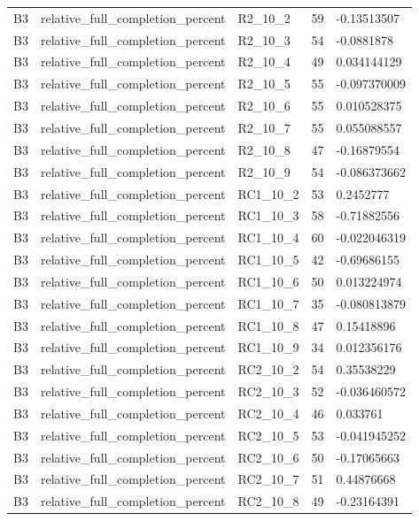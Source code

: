 \begin{longtable}{lllll}
B3 & relative\_full\_completion\_percent & R2\_10\_2 & 59 & -0.13513507 \\
B3 & relative\_full\_completion\_percent & R2\_10\_3 & 54 & -0.0881878 \\
B3 & relative\_full\_completion\_percent & R2\_10\_4 & 49 & 0.034144129 \\
B3 & relative\_full\_completion\_percent & R2\_10\_5 & 55 & -0.097370009 \\
B3 & relative\_full\_completion\_percent & R2\_10\_6 & 55 & 0.010528375 \\
B3 & relative\_full\_completion\_percent & R2\_10\_7 & 55 & 0.055088557 \\
B3 & relative\_full\_completion\_percent & R2\_10\_8 & 47 & -0.16879554 \\
B3 & relative\_full\_completion\_percent & R2\_10\_9 & 54 & -0.086373662 \\
B3 & relative\_full\_completion\_percent & RC1\_10\_2 & 53 & 0.2452777 \\
B3 & relative\_full\_completion\_percent & RC1\_10\_3 & 58 & -0.71882556 \\
B3 & relative\_full\_completion\_percent & RC1\_10\_4 & 60 & -0.022046319 \\
B3 & relative\_full\_completion\_percent & RC1\_10\_5 & 42 & -0.69686155 \\
B3 & relative\_full\_completion\_percent & RC1\_10\_6 & 50 & 0.013224974 \\
B3 & relative\_full\_completion\_percent & RC1\_10\_7 & 35 & -0.080813879 \\
B3 & relative\_full\_completion\_percent & RC1\_10\_8 & 47 & 0.15418896 \\
B3 & relative\_full\_completion\_percent & RC1\_10\_9 & 34 & 0.012356176 \\
B3 & relative\_full\_completion\_percent & RC2\_10\_2 & 54 & 0.35538229 \\
B3 & relative\_full\_completion\_percent & RC2\_10\_3 & 52 & -0.036460572 \\
B3 & relative\_full\_completion\_percent & RC2\_10\_4 & 46 & 0.033761 \\
B3 & relative\_full\_completion\_percent & RC2\_10\_5 & 53 & -0.041945252 \\
B3 & relative\_full\_completion\_percent & RC2\_10\_6 & 50 & -0.17065663 \\
B3 & relative\_full\_completion\_percent & RC2\_10\_7 & 51 & 0.44876668 \\
B3 & relative\_full\_completion\_percent & RC2\_10\_8 & 49 & -0.23164391 \\

\end{longtable}
